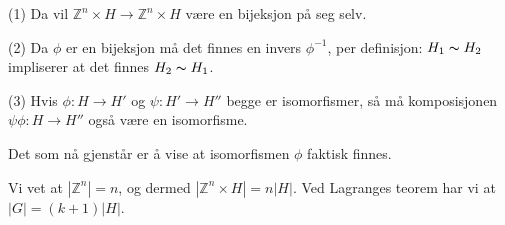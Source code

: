 \documentclass[a4paper,norsk,twocolumn,10pt]{article}
\begin{document}
(1) Da vil $\mathbb{Z}^n \times H \rightarrow \mathbb{Z}^n \times H$ være en
bijeksjon på seg selv.

(2) Da $\phi$ er en bijeksjon må det finnes en invers $\phi^{-1}$, per
definisjon: $H_1 \thicksim H_2$ impliserer at det finnes $H_2 \thicksim H_1$.

(3) Hvis $\phi\colon H \rightarrow H'$ og $\psi\colon H' \rightarrow H''$ begge
er isomorfismer, så må komposisjonen $\psi\phi\colon H \rightarrow H''$ også
være en isomorfisme.

Det som nå gjenstår er å vise at isomorfismen $\phi$ faktisk finnes.

Vi vet at $|\mathbb{Z}^n|=n$, og dermed $|\mathbb{Z}^n \times H| = n|H|$. Ved
Lagranges teorem har vi at $|G|=(k+1)|H|$.
\end{document}
